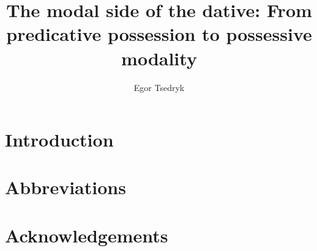 \documentclass[output=paper,modfonts,nonflat]{langsci/langscibook}
\author{Egor Tsedryk	\affiliation{}}
\title{The modal side of the dative: From predicative possession to possessive modality}
\begin{document}
\section{Introduction}  
 
\section*{Abbreviations}
\section*{Acknowledgements}

\sloppy
\printbibliography[heading=subbibliography,notkeyword=this] 
\end{document}
